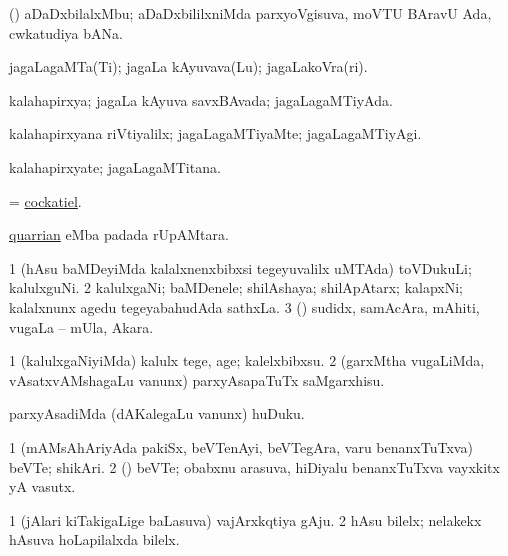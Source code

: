 \bentry
{}
\gl{\nA}
\bmng
(\ca) aDaDxbilalxMbu; aDaDxbililxniMda parxyoVgisuva, moVTU BAravU Ada, cwkatudiya bANa. 
\emng
\eentry

\bentry
{}
\gl{\nA}
\bmng
jagaLagaMTa(Ti); jagaLa kAyuvava(Lu); jagaLakoVra(ri). 
\emng
\eentry

\bentry
{}
\gl{\gu}
\bmng
kalahapirxya; jagaLa kAyuva savxBAvada; jagaLagaMTiyAda. 
\emng
\eentry

\bentry
{}
\gl{\kirxvi}
\bmng
kalahapirxyana riVtiyalilx; jagaLagaMTiyaMte; jagaLagaMTiyAgi. 
\emng
\eentry

\bentry
{}
\gl{\nA}
\bmng
kalahapirxyate; jagaLagaMTitana. 
\emng
\eentry

\bentry
{}
\gl{\nA}
\bmng
= \hyperref{kandict_c.pdf}{C}{cockatiel}{cockatiel}. 
\emng
\eentry

\bentry
{}
\gl{\nA}
\bmng
\hyperlink{quarrian}{quarrian} eMba padada rUpAMtara. 
\emng
\eentry

\bentry
{}
\gl{\nA}
\bmng
\bnum
\num{1} (hAsu baMDeyiMda kalalxnenxbibxsi tegeyuvalilx uMTAda) toVDukuLi; kalulxguNi. 
\num{2} kalulxgaNi; baMDenele; shilAshaya; shilApAtarx; kalapxNi; kalalxnunx agedu tegeyabahudAda sathxLa. 
\num{3} (\rUpa) sudidx, samAcAra, mAhiti, \mo vugaLa -- mUla, Akara. 
\enum
\emng
\eentry

\bentry
{}
\gl{\sakirx}
\bmng
\bnum
\num{1} (kalulxgaNiyiMda) kalulx tege, age; kalelxbibxsu. 
\num{2} (garxMtha \mo vugaLiMda, vAsatxvAMshagaLu \mo vanunx) parxyAsapaTuTx saMgarxhisu. 
\enum
\emng

\noindent
\gl{\akirx}
\bmng
parxyAsadiMda (dAKalegaLu \mo vanunx) huDuku. 
\emng
\eentry

\bentry
{}
\gl{\nA}
\bmng
\bnum
\num{1} (mAMsAhAriyAda pakiSx, beVTenAyi, beVTegAra, \mo varu benanxTuTxva) beVTe; shikAri. 
\num{2} (\rUpa) beVTe; obabxnu arasuva, hiDiyalu benanxTuTxva vayxkitx yA vasutx. 
\enum
\emng
\eentry

\bentry
{}
\gl{\nA}
\bmng
\bnum
\num{1} (jAlari kiTakigaLige baLasuva) vajArxkqtiya gAju. 
\hypertarget{quarry(4)2}{} 
\num{2} hAsu bilelx; nelakekx hAsuva hoLapilalxda bilelx. 
\enum
\emng

